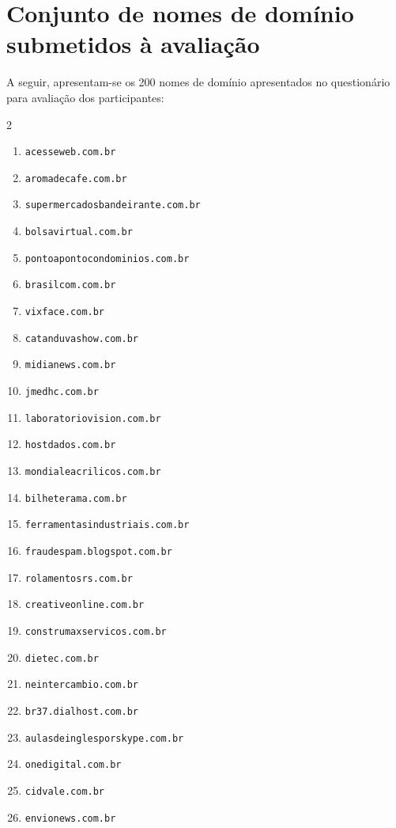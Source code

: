 \section*{Conjunto de nomes de domínio submetidos à avaliação}

A seguir, apresentam-se os 200 nomes de domínio apresentados no questionário para avaliação dos participantes:

\begin{multicols}{2}
\begin{enumerate}\small
    \item \texttt{acesseweb.com.br}
    \item \texttt{aromadecafe.com.br}
    \item \texttt{supermercadosbandeirante.com.br}
    \item \texttt{bolsavirtual.com.br}
    \item \texttt{pontoapontocondominios.com.br}
    \item \texttt{brasilcom.com.br}
    \item \texttt{vixface.com.br}
    \item \texttt{catanduvashow.com.br}
    \item \texttt{midianews.com.br}
    \item \texttt{jmedhc.com.br}
    \item \texttt{laboratoriovision.com.br}
    \item \texttt{hostdados.com.br}
    \item \texttt{mondialeacrilicos.com.br}
    \item \texttt{bilheterama.com.br}
    \item \texttt{ferramentasindustriais.com.br}
    \item \texttt{fraudespam.blogspot.com.br}
    \item \texttt{rolamentosrs.com.br}
    \item \texttt{creativeonline.com.br}
    \item \texttt{construmaxservicos.com.br}
    \item \texttt{dietec.com.br}
    \item \texttt{neintercambio.com.br}
    \item \texttt{br37.dialhost.com.br}
    \item \texttt{aulasdeinglesporskype.com.br}
    \item \texttt{onedigital.com.br}
    \item \texttt{cidvale.com.br}
    \item \texttt{envionews.com.br}

\end{enumerate}
\end{multicols}
